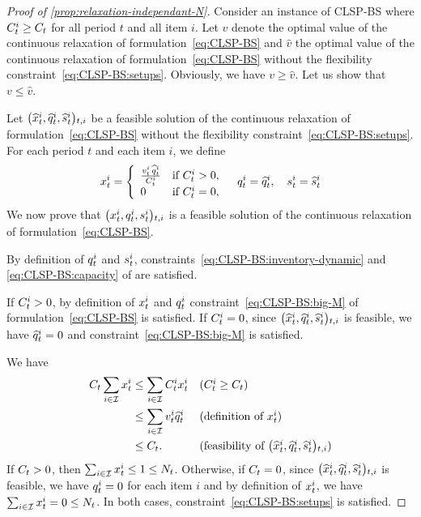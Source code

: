 \begin{proof}[Proof of \cref{prop:relaxation-independant-N}]
Consider an instance of CLSP-BS where $C_t^i\ge C_t$ for all period $t$ and all item $i$.
Let $v$ denote the optimal value of the continuous relaxation of formulation~\eqref{eq:CLSP-BS} and $\widehat{v}$ the optimal value of the continuous relaxation of formulation~\eqref{eq:CLSP-BS} without the flexibility constraint~\eqref{eq:CLSP-BS:setups}.
Obviously, we have $v \ge \widehat{v}$.
Let us show that $v \le \widehat{v}$.

Let $\bracket{\widehat{\setup}_t^i, \widehat{\quantity}_t^i, \widehat{\inventory}_t^i}_{t,i}$ be a feasible solution of the continuous relaxation of formulation~\eqref{eq:CLSP-BS} without the flexibility constraint~\eqref{eq:CLSP-BS:setups}.
For each period $t$ and each item $i$, we define
\begin{equation}
  \setup_t^i=
  \left\{
  \begin{array}{ll}
  \frac{\rate_t^i\,\widehat{\quantity}_t^i}{\capacity_t^i} & \mbox{if}\ \capacity_t^i>0,
  \\
  0 & \mbox{if}\ \capacity_t^i=0,
  \end{array}
  \right.
  \quad
  \quantity_t^i=\widehat{\quantity}_t^i
  ,\quad
  \inventory_t^i=\widehat{\inventory}_t^i
\end{equation}
We now prove that $\bracket{\setup_t^i, \quantity_t^i, \inventory_t^i}_{t,i}$ is a feasible solution of the continuous relaxation of formulation~\eqref{eq:CLSP-BS}.

By definition of $q_t^i$ and $s_t^i$, constraints~\eqref{eq:CLSP-BS:inventory-dynamic} and \eqref{eq:CLSP-BS:capacity} of are satisfied.

If $C_t^i>0$, by definition of $x_t^i$ and $q_t^i$ constraint~\eqref{eq:CLSP-BS:big-M} of formulation~\eqref{eq:CLSP-BS} is satisfied.
If $C_t^i=0$, since $\bracket{\widehat{\setup}_t^i, \widehat{\quantity}_t^i, \widehat{\inventory}_t^i}_{t,i}$ is feasible, we have $\widehat{q}_t^i=0$ and constraint~\eqref{eq:CLSP-BS:big-M} is satisfied. 

We have
\begin{subequations}
\begin{align}
\capacity_t\sum_{i\in\REF}\setup_t^i
&\le
\sum_{i\in\REF}\capacity_t^i\setup_t^i
&& \mbox{($\capacity_t^i\ge\capacity_t$)}
\\
&\le
\sum_{i\in\REF}\rate_t^i\widehat{\quantity}_t^i
&& \mbox{(definition of $\setup_t^i$)}
\\
&\le
\capacity_t.
&& \mbox{(feasibility of $\bracket{\widehat{\setup}_t^i, \widehat{\quantity}_t^i, \widehat{\inventory}_t^i}_{t,i}$)}
\end{align}
\end{subequations}
If $C_t>0$, then $\sum_{i\in\mathcal{I}}x_t^i\le 1\le N_t$.
Otherwise, if $C_t=0$, since $\bracket{\widehat{\setup}_t^i, \widehat{\quantity}_t^i, \widehat{\inventory}_t^i}_{t,i}$ is feasible, we have $q_t^i=0$ for each item $i$ and by definition of $x_t^i$, we have $\sum_{i\in\mathcal{I}}x_t^i=0\le N_t$.
In both cases, constraint~\eqref{eq:CLSP-BS:setups} is satisfied.


\end{proof}
